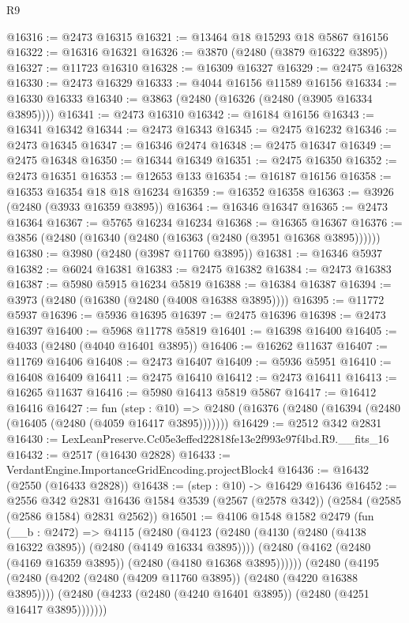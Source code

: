 \begin{lexlean}{R9}
\begin{coremodule}
@16316 := @2473 @16315
@16321 := @13464 @18 @15293 @18 @5867 @16156
@16322 := @16316 @16321
@16326 := @3870 (@2480 (@3879 @16322 @3895))
@16327 := @11723 @16310
@16328 := @16309 @16327
@16329 := @2475 @16328
@16330 := @2473 @16329
@16333 := @4044 @16156 @11589 @16156
@16334 := @16330 @16333
@16340 := @3863 (@2480 (@16326 (@2480 (@3905 @16334 @3895))))
@16341 := @2473 @16310
@16342 := @16184 @16156
@16343 := @16341 @16342
@16344 := @2473 @16343
@16345 := @2475 @16232
@16346 := @2473 @16345
@16347 := @16346 @2474
@16348 := @2475 @16347
@16349 := @2475 @16348
@16350 := @16344 @16349
@16351 := @2475 @16350
@16352 := @2473 @16351
@16353 := @12653 @133
@16354 := @16187 @16156
@16358 := @16353 @16354 @18 @18 @16234
@16359 := @16352 @16358
@16363 := @3926 (@2480 (@3933 @16359 @3895))
@16364 := @16346 @16347
@16365 := @2473 @16364
@16367 := @5765 @16234 @16234
@16368 := @16365 @16367
@16376 := @3856 (@2480 (@16340 (@2480 (@16363 (@2480 (@3951 @16368 @3895))))))
@16380 := @3980 (@2480 (@3987 @11760 @3895))
@16381 := @16346 @5937
@16382 := @6024 @16381
@16383 := @2475 @16382
@16384 := @2473 @16383
@16387 := @5980 @5915 @16234 @5819
@16388 := @16384 @16387
@16394 := @3973 (@2480 (@16380 (@2480 (@4008 @16388 @3895))))
@16395 := @11772 @5937
@16396 := @5936 @16395
@16397 := @2475 @16396
@16398 := @2473 @16397
@16400 := @5968 @11778 @5819
@16401 := @16398 @16400
@16405 := @4033 (@2480 (@4040 @16401 @3895))
@16406 := @16262 @11637
@16407 := @11769 @16406
@16408 := @2473 @16407
@16409 := @5936 @5951
@16410 := @16408 @16409
@16411 := @2475 @16410
@16412 := @2473 @16411
@16413 := @16265 @11637
@16416 := @5980 @16413 @5819 @5867
@16417 := @16412 @16416
@16427 := fun (step : @10) =>
  @2480 (@16376 (@2480 (@16394 (@2480 (@16405 (@2480 (@4059 @16417 @3895)))))))
@16429 := @2512 @342 @2831
@16430 := LexLeanPreserve.Cc05e3effed22818fe13e2f993e97f4bd.R9.__fits_16
@16432 := @2517 (@16430 @2828)
@16433 := VerdantEngine.ImportanceGridEncoding.projectBlock4
@16436 := @16432 (@2550 (@16433 @2828))
@16438 := (step : @10) -> @16429 @16436
@16452 := @2556
    @342
    @2831
    @16436
    @1584
    @3539
    (@2567 (@2578 @342))
    (@2584 (@2585 (@2586 @1584) @2831 @2562))
@16501 := @4106
    @1548
    @1582
    @2479
    (fun (__b : @2472) =>
    @4115
      (@2480
        (@4123
          (@2480 (@4130 (@2480 (@4138 @16322 @3895)) (@2480 (@4149 @16334 @3895))))
          (@2480 (@4162 (@2480 (@4169 @16359 @3895)) (@2480 (@4180 @16368 @3895))))))
      (@2480
        (@4195
          (@2480 (@4202 (@2480 (@4209 @11760 @3895)) (@2480 (@4220 @16388 @3895))))
          (@2480 (@4233 (@2480 (@4240 @16401 @3895)) (@2480 (@4251 @16417 @3895)))))))

\end{coremodule}
\end{lexlean}
